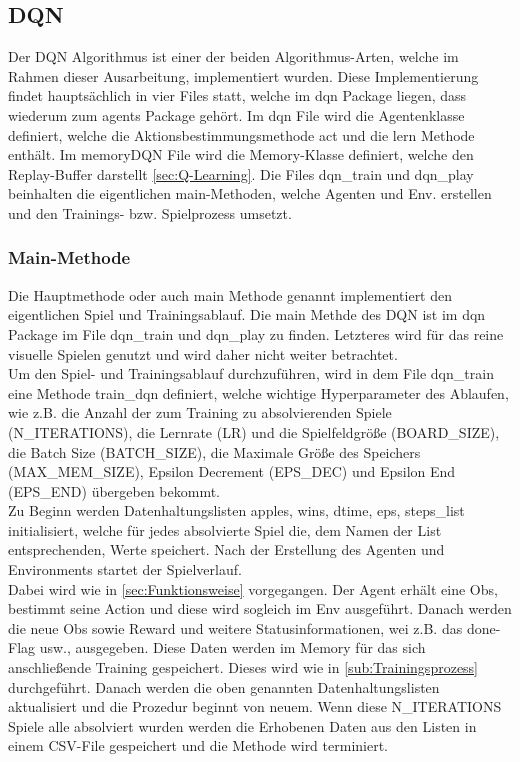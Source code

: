 \subsection{DQN} \label{sec:Impl:DQN}
Der DQN Algorithmus ist einer der beiden Algorithmus-Arten, welche im Rahmen dieser Ausarbeitung, implementiert wurden. Diese Implementierung findet hauptsächlich in vier Files statt, welche im dqn Package liegen, dass wiederum zum agents Package gehört.
Im dqn File wird die Agentenklasse definiert, welche die Aktionsbestimmungsmethode act und die lern Methode enthält. 
Im memoryDQN File wird die Memory-Klasse definiert, welche den Replay-Buffer darstellt \ref{sec:Q-Learning}. 
Die Files dqn\_train und dqn\_play beinhalten die eigentlichen main-Methoden, welche Agenten und Env. erstellen und den Trainings- bzw. Spielprozess umsetzt.

\subsubsection{Main-Methode} \label{sec:Impl:Main_Methode}
Die Hauptmethode oder auch main Methode genannt implementiert den eigentlichen Spiel und Trainingsablauf. Die main Methde des DQN ist im dqn Package im File dqn\_train und dqn\_play zu finden. Letzteres wird für das reine visuelle Spielen genutzt und wird daher nicht weiter betrachtet.\\
Um den Spiel- und Trainingsablauf durchzuführen, wird in dem File dqn\_train eine Methode train\_dqn definiert, welche wichtige Hyperparameter des Ablaufen, wie z.B. die Anzahl der zum Training zu absolvierenden Spiele (N\_ITERATIONS), die Lernrate (LR) und die Spielfeldgröße (BOARD\_SIZE), die Batch Size (BATCH\_SIZE), die Maximale Größe des Speichers (MAX\_MEM\_SIZE), Epsilon Decrement (EPS\_DEC) und Epsilon End (EPS\_END) übergeben bekommt.\\
Zu Beginn werden Datenhaltungslisten apples, wins, dtime, eps, steps\_list initialisiert, welche für jedes absolvierte Spiel die, dem Namen der List entsprechenden, Werte speichert. Nach der Erstellung des Agenten und Environments startet der Spielverlauf.\\
Dabei wird wie in \ref{sec:Funktionsweise} vorgegangen. Der Agent erhält eine Obs, bestimmt seine Action und diese wird sogleich im Env ausgeführt. Danach werden die neue Obs sowie Reward und weitere Statusinformationen, wei z.B. das done-Flag usw., ausgegeben. Diese Daten werden im Memory für das sich anschließende Training gespeichert. Dieses wird wie in \ref{sub:Trainingsprozess} durchgeführt. Danach werden die oben genannten Datenhaltungslisten aktualisiert und die Prozedur beginnt von neuem. Wenn diese N\_ITERATIONS Spiele alle absolviert wurden werden die Erhobenen Daten aus den Listen in einem CSV-File gespeichert und die Methode wird terminiert. 

